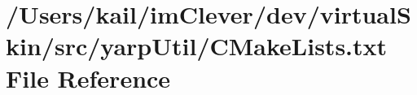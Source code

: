 \hypertarget{src_2yarp_util_2_c_make_lists_8txt}{
\section{/Users/kail/imClever/dev/virtualSkin/src/yarpUtil/CMakeLists.txt File Reference}
\label{src_2yarp_util_2_c_make_lists_8txt}
}
